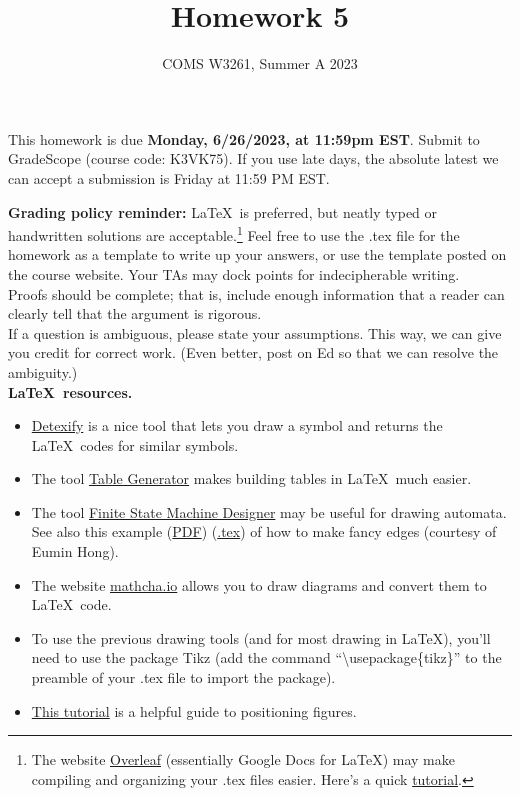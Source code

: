 \documentclass[letterpaper,11pt,twoside]{article}
\title{Homework 5}
\date{COMS W3261, Summer A 2023}
\theoremstyle{plain}
\theoremstyle{definition}
\theoremstyle{remark}
\theoremstyle{restate}
\begin{document}
\maketitle

This homework is due \textbf{Monday, 6/26/2023, at 11:59pm EST}. Submit to GradeScope (course code: K3VK75). If you use late days, the absolute latest we can accept a submission is Friday at 11:59 PM EST.

\textbf{Grading policy reminder:} \LaTeX~is preferred, but neatly typed or handwritten solutions are acceptable.\footnote{The website \href{https://www.overleaf.com/}{Overleaf} (essentially Google Docs for LaTeX) may make compiling and organizing your .tex files easier. Here's a quick \href{https://www.overleaf.com/learn/latex/Learn_LaTeX_in_30_minutes}{tutorial}.} Feel free to use the .tex file for the homework as a template to write up your answers, or use the template posted on the course website. Your TAs may dock points for indecipherable writing.\\

Proofs should be complete; that is, include enough information that a reader can clearly tell that the argument is rigorous. \\

If a question is ambiguous, please state your assumptions. This way, we can give you credit for correct work. (Even better, post on Ed so that we can resolve the ambiguity.) \\

\textbf{\LaTeX~resources.}
\begin{itemize}
    \item \href{https://detexify.kirelabs.org/classify.html}{Detexify} is a nice tool that lets you draw a symbol and returns the \LaTeX~codes for similar symbols. 
    \item The tool \href{https://www.tablesgenerator.com/}{Table Generator} makes building tables in \LaTeX~much easier.
    \item The tool \href{http://madebyevan.com/fsm/}{Finite State Machine Designer} may be useful for drawing automata. See also this example (\href{https://static.us.edusercontent.com/files/HZeTXimODzWeLvHIqsvjL2BG}{PDF}) (\href{https://static.us.edusercontent.com/files/RI3W8tQNvHMWFe9MkXV1KztA}{.tex}) of how to make fancy edges (courtesy of Eumin Hong).
    \item The website \href{https://www.mathcha.io/}{mathcha.io} allows you to draw diagrams and convert them to \LaTeX~code.
    \item To use the previous drawing tools (and for most drawing in \LaTeX), you'll need to use the package Tikz (add the command ``\textbackslash usepackage\{tikz\}'' to the preamble of your .tex file to import the package). 
    \item \href{https://www.overleaf.com/learn/latex/Positioning_of_Figures}{This tutorial} is a helpful guide to positioning figures.
\end{itemize}  
\end{document}

